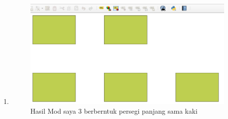 \begin{enumerate}
    \item 
	
	\begin{figure}[H]
		\includegraphics[width=12cm]{figures/1174059/Python1/soal10.PNG}
		\centering
		\caption{Hasil Mod saya 3 berberntuk persegi panjang sama kaki}
	\end{figure}
\end{enumerate}